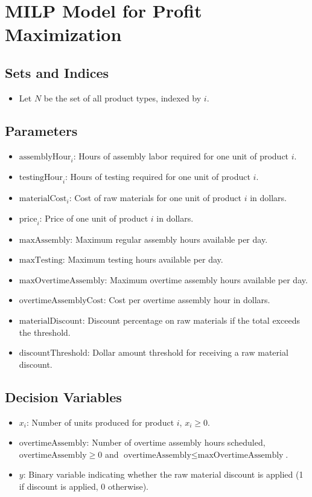 \documentclass{article}
\begin{document}
\section*{MILP Model for Profit Maximization}

\subsection*{Sets and Indices}
\begin{itemize}
    \item Let \( N \) be the set of all product types, indexed by \( i \).
\end{itemize}

\subsection*{Parameters}
\begin{itemize}
    \item \( \text{assemblyHour}_i \): Hours of assembly labor required for one unit of product \( i \).
    \item \( \text{testingHour}_i \): Hours of testing required for one unit of product \( i \).
    \item \( \text{materialCost}_i \): Cost of raw materials for one unit of product \( i \) in dollars.
    \item \( \text{price}_i \): Price of one unit of product \( i \) in dollars.
    \item \( \text{maxAssembly} \): Maximum regular assembly hours available per day.
    \item \( \text{maxTesting} \): Maximum testing hours available per day.
    \item \( \text{maxOvertimeAssembly} \): Maximum overtime assembly hours available per day.
    \item \( \text{overtimeAssemblyCost} \): Cost per overtime assembly hour in dollars.
    \item \( \text{materialDiscount} \): Discount percentage on raw materials if the total exceeds the threshold.
    \item \( \text{discountThreshold} \): Dollar amount threshold for receiving a raw material discount.
\end{itemize}

\subsection*{Decision Variables}
\begin{itemize}
    \item \( x_i \): Number of units produced for product \( i \), \( x_i \geq 0 \).
    \item \( \text{overtimeAssembly} \): Number of overtime assembly hours scheduled, \( \text{overtimeAssembly} \geq 0 \) and \( \text{overtimeAssembly} \leq \text{maxOvertimeAssembly} \).
    \item \( y \): Binary variable indicating whether the raw material discount is applied (1 if discount is applied, 0 otherwise).
\end{itemize}
\end{document}
